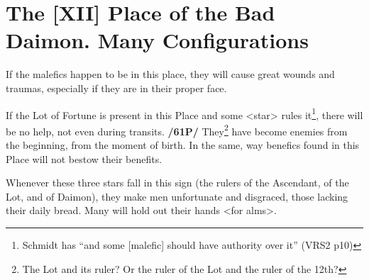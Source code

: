 \section{The [XII] Place of the Bad Daimon. Many Configurations}
If the malefics happen to be in this place, they will cause great wounds and traumas, especially if they are in their proper face. 


If the Lot of Fortune is present in this Place and some <star> rules it\footnote{Schmidt has ``and some [malefic] should have authority over it'' (VRS2 p10)}, there will be no help, not even during transits. \textbf{/61P/} They\footnote{The Lot and its ruler? Or the ruler of the Lot and the ruler of the 12th?} have become enemies from the beginning, from the moment of birth. In the same, way benefics found in this Place will not bestow their benefits. 

Whenever these three stars fall in this sign (the rulers of the Ascendant, of the Lot, and of Daimon), they make men unfortunate and disgraced, those lacking their daily bread. Many will hold out their hands <for alms>.

\newpage